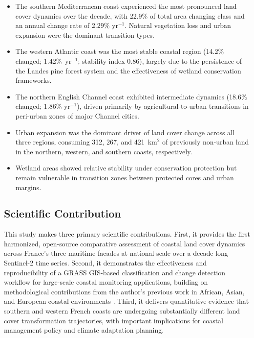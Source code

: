 \documentclass[coasts,article,accept,pdftex,moreauthors]{Definitions/mdpi}
\begin{document}
\begin{itemize}
\item The southern Mediterranean coast experienced the most pronounced land cover dynamics over the decade, with 22.9\% of total area changing class and an annual change rate of 2.29\% yr$^{-1}$. Natural vegetation loss and urban expansion were the dominant transition types.

\item The western Atlantic coast was the most stable coastal region (14.2\% changed; 1.42\%~yr$^{-1}$; stability index 0.86), largely due to the persistence of the Landes pine forest system and the effectiveness of wetland conservation frameworks.

\item The northern English Channel coast exhibited intermediate dynamics (18.6\% changed; 1.86\% yr$^{-1}$), driven primarily by agricultural-to-urban transitions in peri-urban zones of major Channel cities.

\item Urban expansion was the dominant driver of land cover change across all three regions, consuming 312, 267, and 421~km$^2$ of previously non-urban land in the northern, western, and southern coasts, respectively.

\item Wetland areas showed relative stability under conservation protection but remain vulnerable in transition zones between protected cores and urban margins.
\end{itemize}

\subsection{{Scientific Contribution}}

This study makes three primary scientific contributions. First, it provides the first harmonized, open-source comparative assessment of coastal land cover dynamics across France's three maritime facades at national scale over a decade-long Sentinel-2 time series. Second, it demonstrates the effectiveness and reproducibility of a GRASS GIS-based classification and change detection workflow for large-scale coastal monitoring applications, building on methodological contributions from the author's previous work in African, Asian, and European coastal environments \citep{jmse12081279,jimaging11080249}. Third, it delivers quantitative evidence that southern and western French coasts are undergoing substantially different land cover transformation trajectories, with important implications for coastal management policy and climate adaptation planning.
\end{document}
